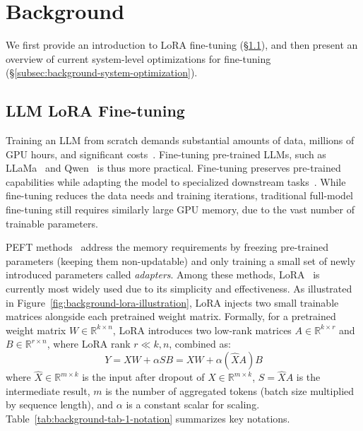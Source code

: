 \normalsize
\section{Background}
\label{sec:background}

We first provide an introduction to LoRA fine-tuning (§\ref{subsec:background-llm-lora-finetuning}), and then present an overview of current system-level optimizations for fine-tuning (§\ref{subsec:background-system-optimization}).



\subsection{LLM LoRA Fine-tuning}
\label{subsec:background-llm-lora-finetuning}

Training an LLM from scratch demands substantial amounts of data, millions of GPU hours, and significant costs~\cite{llama3.1-training-cost}.
Fine-tuning pre-trained LLMs, such as LLaMa~\cite{llama3,llama3.1} and Qwen~\cite{bai2023qwen,yang2024qwen2-5} is thus more practical.
Fine-tuning preserves pre-trained capabilities while adapting the model to specialized downstream tasks~\cite{devlin2018bert}.
While fine-tuning reduces the data needs and training iterations, traditional full-model fine-tuning still requires similarly large GPU memory, due to the vast number of trainable parameters.

PEFT methods~\cite{hu2022lora,li2021prefix-tuning,lester2021prompt-tuning} address the memory requirements by freezing pre-trained parameters (keeping them non-updatable) and only training a small set of newly introduced parameters called \textit{adapters}.
Among these methods, LoRA~\cite{hu2022lora} is currently most widely used due to its simplicity and effectiveness. As illustrated in Figure~\ref{fig:background-lora-illustration}, LoRA injects two small trainable matrices alongside each pretrained weight matrix.
%
Formally, for a pretrained weight matrix $W \in \mathbb{R}^{k \times n}$, LoRA introduces two low-rank matrices $A \in \mathbb{R}^{k \times r}$ and $B \in \mathbb{R}^{r \times n}$, where LoRA rank $r \ll k,n$, combined as:
\begin{equation}
Y = X W + \alpha S B = X W + \alpha (\widehat{X} A) B
\end{equation}
where $\widehat{X} \in \mathbb{R}^{m \times k}$ is the input after dropout of $X \in \mathbb{R}^{m \times k}$, $S=\widehat{X} A$ is the intermediate result, $m$ is the number of aggregated tokens (batch size multiplied by sequence length), and $\alpha$ is a constant scalar for scaling.
Table~\ref{tab:background-tab-1-notation} summarizes key notations.

